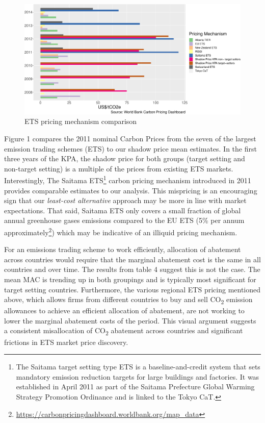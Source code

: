 \documentclass[
  10pt,
]{article}
\begin{document}
\begin{figure}[H]
\includegraphics{figures/paper-ETS comparision-1} \caption{ETS pricing mechanism comparison}\label{fig:ETS comparision}
\end{figure}

Figure 1 compares the 2011 nominal Carbon Prices from the seven of the
largest emission trading schemes (ETS) to our shadow price mean
estimates. In the first three years of the KPA, the shadow price for
both groups (target setting and non-target setting) is a multiple of the
prices from existing ETS markets. Interestingly, The Saitama
ETS\footnote{The Saitama target setting type ETS is a
  baseline-and-credit system that sets mandatory emission reduction
  targets for large buildings and factories. It was established in April
  2011 as part of the Saitama Prefecture Global Warming Strategy
  Promotion Ordinance and is linked to the Tokyo CaT.} carbon pricing
mechanism introduced in 2011 provides comparable estimates to our
analysis. This mispricing is an encouraging sign that our
\emph{least-cost alternative} approach may be more in line with market
expectations. That said, Saitama ETS only covers a small fraction of
global annual greenhouse gases emissions compared to the EU ETS (5\% per
annum approximately\footnote{\url{https://carbonpricingdashboard.worldbank.org/map_data}})
which may be indicative of an illiquid pricing mechanism.

For an emissions trading scheme to work efficiently, allocation of
abatement across countries would require that the marginal abatement
cost is the same in all countries and over time. The results from table
4 suggest this is not the case. The mean MAC is trending up in both
groupings and is typically most significant for target setting
countries. Furthermore, the various regional ETS pricing mentioned
above, which allows firms from different countries to buy and sell
CO\textsubscript{2} emission allowances to achieve an efficient
allocation of abatement, are not working to lower the marginal abatement
costs of the period. This visual argument suggests a consistent
misallocation of CO\textsubscript{2} abatement across countries and
significant frictions in ETS market price discovery.
\end{document}
